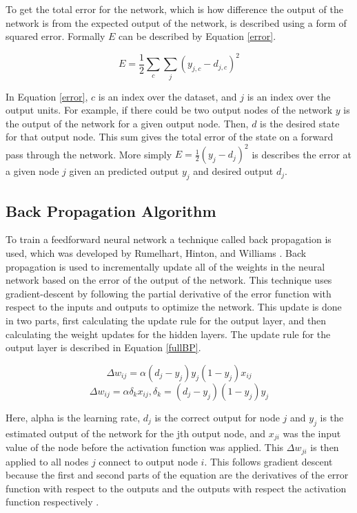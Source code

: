 \documentclass[jair, twoside,11pt,theapa]{article}
\begin{document}
To get the total error for the network, which is how difference the output of the network is from the expected output of the network, is described using a form of squared error. Formally $E$ can be described by Equation \ref{error}\cite{BackProp}.

\begin{equation}
\label{error}
E = \frac{1}{2} \sum_{c}\sum_{j}(y_{j,c}-d_{j,c})^2
\end{equation}


In Equation \ref{error}, $c$ is an index over the dataset, and $j$ is an index over the output units. 
For example, if there could be two output nodes of the network $y$ is the output of the network for a given output node.
Then, $d$ is the desired state for that output node. 
This sum gives the total error of the state on a forward pass through the network.
More simply $ E = \frac{1}{2}(y_{j}-d_{j})^2$ is describes the error at a given node $j$ given an predicted output $y_j$ and desired output $d_j$. 

\subsection{Back Propagation Algorithm}
\label{Back Propagation}
To train a feedforward neural network a technique called back propagation is used, which was developed by Rumelhart, Hinton, and Williams . 
Back propagation is used to incrementally update all of the weights in the neural network based on the error of the output of the network. 
This technique uses gradient-descent by following the partial derivative of the error function with respect to the inputs and outputs to optimize the network. 
This update is done in two parts, first calculating the update rule for the output layer, and then calculating the weight updates for the hidden layers.  
The update rule for the output layer is described in Equation \ref{fullBP}.

\begin{equation}
\label{fullBP}
\Delta w_{ij} = \alpha (d_j - y_j)y_j(1-y_j)x_{ij} 
\end{equation}
\begin{equation}
\label{delta_k}
\Delta w_{ij} = \alpha \delta_k x_{ij}, \delta_k = (d_j - y_j)(1-y_j)y_j
\end{equation}

Here, alpha is the learning rate, $d_j$ is the correct output for node $j$ and $y_j$ is the estimated output of the network for the jth output node, and $x_{ji}$ was the input value of the node before the activation function was applied. This $\Delta w_{ji}$ is then applied to all nodes $j$ connect to output node $i$. This follows gradient descent because the first and second parts of the equation are the derivatives of the error function with respect to the outputs and the outputs with respect the activation function respectively \cite{BackProp}.
\end{document}
